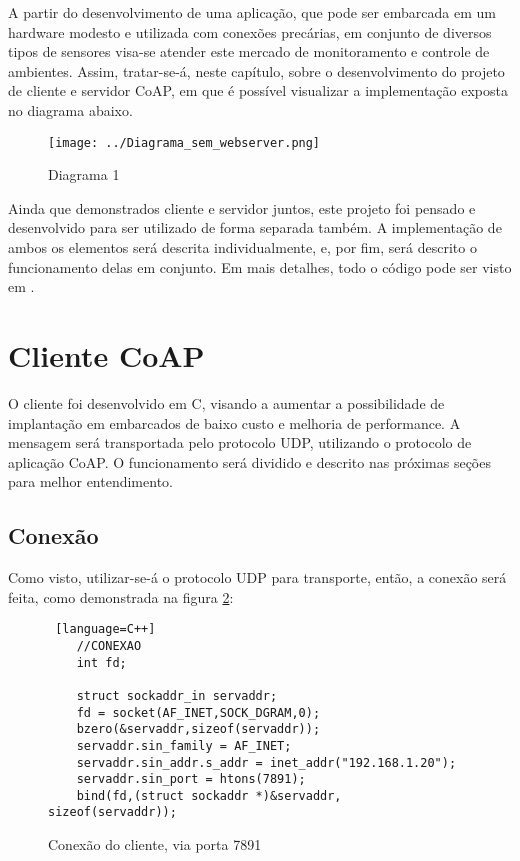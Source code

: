 A partir do desenvolvimento de uma aplicação, que pode ser embarcada em um hardware modesto e utilizada com conexões precárias, em conjunto de diversos tipos de sensores visa-se atender este mercado de monitoramento e controle de ambientes. Assim, tratar-se-á, neste capítulo, sobre o desenvolvimento do projeto de cliente e servidor CoAP, em que é possível visualizar a implementação exposta no diagrama abaixo.

\begin{figure}[!htb]
	\centering
	\texttt{[image: ../Diagrama\_sem\_webserver.png]}
	\caption{Diagrama 1}
	\label{fig:Diagrama_lin_emb}
\end{figure}

Ainda que demonstrados cliente e servidor juntos, este projeto foi pensado e desenvolvido para ser utilizado de forma separada também. A implementação de ambos os elementos será descrita individualmente, e, por fim, será descrito o funcionamento delas em conjunto. Em mais detalhes, todo o código pode ser visto em \cite{cliente_servidor_coap}.

\section{Cliente CoAP}
O cliente foi desenvolvido em C, visando a aumentar a possibilidade de implantação em embarcados de baixo custo e melhoria de performance. A mensagem será transportada pelo protocolo UDP, utilizando o protocolo de aplicação CoAP. O funcionamento será dividido e descrito nas próximas seções para melhor entendimento.


\subsection{Conexão}
Como visto, utilizar-se-á o protocolo UDP para transporte, então, a conexão será feita, como demonstrada na figura \ref{code:conexao_cliente}:

\begin{figure}[!htb]
	\begin{lstlisting} [language=C++]
	//CONEXAO
	int fd;
	
	struct sockaddr_in servaddr;
	fd = socket(AF_INET,SOCK_DGRAM,0);
	bzero(&servaddr,sizeof(servaddr));
	servaddr.sin_family = AF_INET;
	servaddr.sin_addr.s_addr = inet_addr("192.168.1.20");
	servaddr.sin_port = htons(7891);
	bind(fd,(struct sockaddr *)&servaddr, sizeof(servaddr));
	\end{lstlisting}
	\caption{Conexão do cliente, via porta 7891}
	\label{code:conexao_cliente}
\end{figure}

